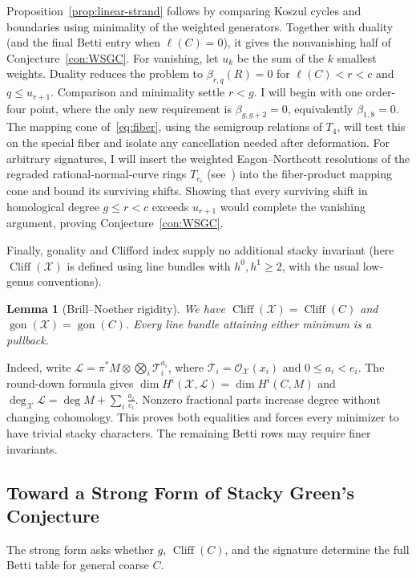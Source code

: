 \documentclass[11pt,reqno]{amsart}
\newtheorem{lemma}{Lemma}[section]
\theoremstyle{remark}
\newcommand{\gon}{\operatorname{gon}}
\newcommand{\cliff}{\operatorname{Cliff}}
\newcommand{\cL}{\mathcal{L}}
\newcommand{\cO}{\mathcal{O}}
\newcommand{\cT}{\mathcal{T}}
\newcommand{\cX}{\mathcal{X}}
\begin{document}
Proposition~\ref{prop:linear-strand} follows by comparing Koszul cycles and boundaries using minimality of the weighted generators. Together with duality (and the final Betti entry when $\ell(C)=0$), it gives the nonvanishing half of Conjecture~\ref{con:WSGC}. For vanishing, let $u_k$ be the sum of the $k$ smallest weights. Duality reduces the problem to $\beta_{r,q}(R)=0$ for $\ell(C)<r<c$ and $q\leq u_{r+1}$. Comparison and minimality settle $r<g$. I will begin with one order-four point, where the only new requirement is $\beta_{g,g+2}=0$, equivalently $\beta_{1,8}=0$. The mapping cone of~\eqref{eq:fiber}, using the semigroup relations of $T_4$, will test this on the special fiber and isolate any cancellation needed after deformation. For arbitrary signatures, I will insert the weighted Eagon--Northcott resolutions of the regraded rational-normal-curve rings $T_{e_i}$ (see~\cite{davisSobieska25,banksRamkumar26}) into the fiber-product mapping cone and bound its surviving shifts. Showing that every surviving shift in homological degree $g\leq r<c$ exceeds $u_{r+1}$ would complete the vanishing argument, proving Conjecture~\ref{con:WSGC}.

Finally, gonality and Clifford index supply no additional stacky invariant (here $\cliff(\cX)$ is defined using line bundles with $h^0,h^1\geq2$, with the usual low-genus conventions).

\begin{lemma}[Brill--Noether rigidity]\label{prop:bn-rigidity}
We have $\cliff(\cX)=\cliff(C)$ and $\gon(\cX)=\gon(C)$. Every line bundle attaining either minimum is a pullback.
\end{lemma}

Indeed, write $\cL=\pi^*M\otimes\bigotimes_i\cT_i^{a_i}$, where $\cT_i=\cO_{\cX}(x_i)$ and $0\leq a_i<e_i$. The round-down formula gives $\dim H^i(\cX,\cL)=\dim H^i(C,M)$ and $\deg_{\cX}\cL=\deg M+\sum_i\frac{a_i}{e_i}$. Nonzero fractional parts increase degree without changing cohomology. This proves both equalities and forces every minimizer to have trivial stacky characters. The remaining Betti rows may require finer invariants.

\subsection{Toward a Strong Form of Stacky Green's Conjecture}\label{subsec:middle}

The strong form asks whether $g$, $\cliff(C)$, and the signature determine the full Betti table for general coarse $C$.
\end{document}
